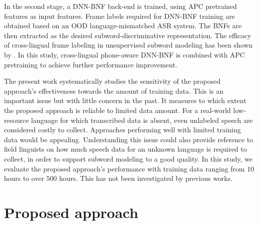 \documentclass[a4paper]{article}
\begin{document}
In  the second stage, a DNN-BNF back-end is trained, using APC pretrained features as input features. 
Frame labels required for DNN-BNF training are obtained based on an OOD language-mismatched ASR system.  
The BNFs are then extracted as the desired subword-discriminative representation. 
The efficacy of cross-lingual frame labeling in unsupervised subword modeling  has been shown by \cite{feng2018exploiting,feng2019_TASLP}. In this study, cross-lingual phone-aware DNN-BNF is combined  with APC pretraining to achieve further performance improvement.

The present work systematically studies the  sensitivity of the proposed approach's effectiveness towards  the amount of training data.
This is an important issue but with little concern in the past. 
It measures to which extent the proposed approach is reliable to limited data amount. For a real-world low-resource language for which transcribed data is absent, 
even unlabeled speech are considered costly to collect. Approaches performing well with limited training data  would be appealing. 
Understanding this issue  could also provide reference to field linguists on how much speech data for an unknown language  is required to collect, in order to support subword modeling to a good quality. 
In this study, we evaluate the proposed approach's performance with    training data ranging from $10$ hours to over $500$ hours. This has not been investigated by previous works.


\section{Proposed approach}
\end{document}
